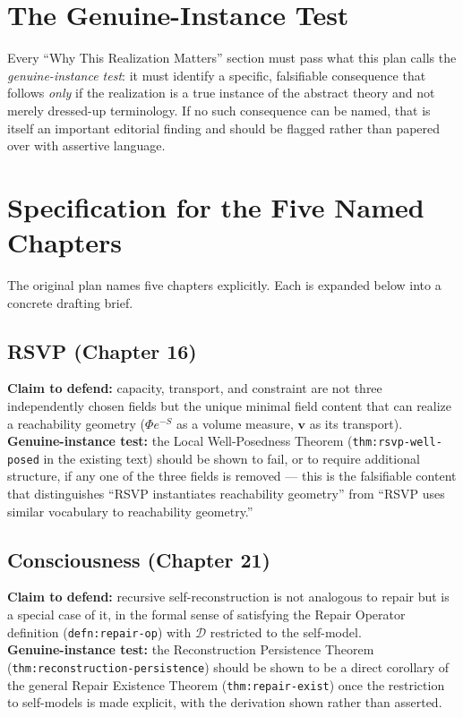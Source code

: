 \documentclass[11pt]{report}
\begin{document}
\section{The Genuine-Instance Test}

Every ``Why This Realization Matters'' section must pass what
this plan calls the \emph{genuine-instance test}: it must
identify a specific, falsifiable consequence that follows
\emph{only} if the realization is a true instance of the
abstract theory and not merely dressed-up terminology. If no
such consequence can be named, that is itself an important
editorial finding and should be flagged rather than papered
over with assertive language.

\section{Specification for the Five Named Chapters}

The original plan names five chapters explicitly. Each is
expanded below into a concrete drafting brief.

\subsection*{RSVP (Chapter 16)}
\textbf{Claim to defend:} capacity, transport, and constraint
are not three independently chosen fields but the unique
minimal field content that can realize a reachability geometry
($\Phi e^{-S}$ as a volume measure, $\mathbf{v}$ as its
transport).\\
\textbf{Genuine-instance test:} the Local Well-Posedness
Theorem (\texttt{thm:rsvp-well-posed} in the existing text)
should be shown to fail, or to require additional structure, if
any one of the three fields is removed --- this is the
falsifiable content that distinguishes ``RSVP instantiates
reachability geometry'' from ``RSVP uses similar vocabulary to
reachability geometry.''

\subsection*{Consciousness (Chapter 21)}
\textbf{Claim to defend:} recursive self-reconstruction is not
analogous to repair but is a special case of it, in the formal
sense of satisfying the Repair Operator definition
(\texttt{defn:repair-op}) with $\mathcal{D}$ restricted to the
self-model.\\
\textbf{Genuine-instance test:} the Reconstruction Persistence
Theorem (\texttt{thm:reconstruction-persistence}) should be shown
to be a direct corollary of the general Repair Existence
Theorem (\texttt{thm:repair-exist}) once the restriction to
self-models is made explicit, with the derivation shown rather
than asserted.
\end{document}
